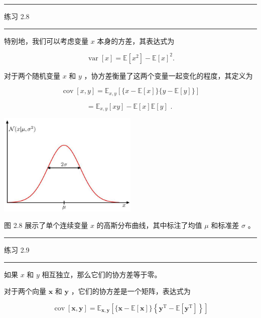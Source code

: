 \documentclass[10pt]{article}
\newcommand{\HRule}{\begin{center}\rule{0.9\linewidth}{0.2mm}\end{center}}
\begin{document}
\HRule

练习 2.8

\HRule

特别地，我们可以考虑变量 \(x\) 本身的方差，其表达式为

\[
\operatorname{var}\left\lbrack  x\right\rbrack   = \mathbb{E}\left\lbrack  {x}^{2}\right\rbrack   - \mathbb{E}{\left\lbrack  x\right\rbrack  }^{2}. \tag{2.46}
\]

对于两个随机变量 \(x\) 和 \(y\) ，协方差衡量了这两个变量一起变化的程度，其定义为

\[
\operatorname{cov}\left\lbrack  {x,y}\right\rbrack   = {\mathbb{E}}_{x,y}\left\lbrack  {\{ x - \mathbb{E}\left\lbrack  x\right\rbrack  \} \{ y - \mathbb{E}\left\lbrack  y\right\rbrack  \} }\right\rbrack
\]

\[
= {\mathbb{E}}_{x,y}\left\lbrack  {xy}\right\rbrack   - \mathbb{E}\left\lbrack  x\right\rbrack  \mathbb{E}\left\lbrack  y\right\rbrack  \text{ . } \tag{2.47}
\]

\begin{center}
\includegraphics[max width=0.5\textwidth]{images/0194e279-9b28-703a-88f4-c3ac21e2010d_55_884_344_669_490_0.jpg}
\end{center}
\hspace*{3em} 

图 2.8 展示了单个连续变量 \(x\) 的高斯分布曲线，其中标注了均值 \(\mu\) 和标准差 \(\sigma\) 。

\HRule

练习 2.9

\HRule

如果 \(x\) 和 \(y\) 相互独立，那么它们的协方差等于零。

对于两个向量 \(\mathbf{x}\) 和 \(\mathbf{y}\) ，它们的协方差是一个矩阵，表达式为

\[
\operatorname{cov}\left\lbrack  {\mathbf{x},\mathbf{y}}\right\rbrack   = {\mathbb{E}}_{\mathbf{x},\mathbf{y}}\left\lbrack  {\{ \mathbf{x} - \mathbb{E}\left\lbrack  \mathbf{x}\right\rbrack  \} \left\{  {{\mathbf{y}}^{\mathrm{T}} - \mathbb{E}\left\lbrack  {\mathbf{y}}^{\mathrm{T}}\right\rbrack  }\right\}  }\right\rbrack
\]
\end{document}
